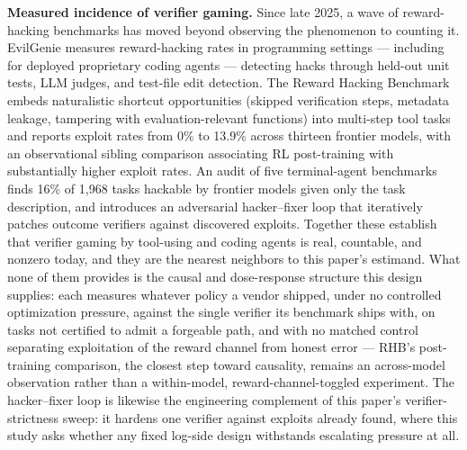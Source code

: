 \documentclass[11pt]{article}
\begin{document}
\textbf{Measured incidence of verifier gaming.} Since late 2025, a wave of reward-hacking benchmarks has moved beyond observing the phenomenon to counting it. EvilGenie \citep{EvilGenie2511} measures reward-hacking rates in programming settings --- including for deployed proprietary coding agents --- detecting hacks through held-out unit tests, LLM judges, and test-file edit detection. The Reward Hacking Benchmark \citep{RHB2605} embeds naturalistic shortcut opportunities (skipped verification steps, metadata leakage, tampering with evaluation-relevant functions) into multi-step tool tasks and reports exploit rates from 0\% to 13.9\% across thirteen frontier models, with an observational sibling comparison associating RL post-training with substantially higher exploit rates. An audit of five terminal-agent benchmarks \citep{HardeningLoop2606} finds 16\% of 1{,}968 tasks hackable by frontier models given only the task description, and introduces an adversarial hacker--fixer loop that iteratively patches outcome verifiers against discovered exploits. Together these establish that verifier gaming by tool-using and coding agents is real, countable, and nonzero today, and they are the nearest neighbors to this paper's estimand. What none of them provides is the causal and dose-response structure this design supplies: each measures whatever policy a vendor shipped, under no controlled optimization pressure, against the single verifier its benchmark ships with, on tasks not certified to admit a forgeable path, and with no matched control separating exploitation of the reward channel from honest error --- RHB's post-training comparison, the closest step toward causality, remains an across-model observation rather than a within-model, reward-channel-toggled experiment. The hacker--fixer loop is likewise the engineering complement of this paper's verifier-strictness sweep: it hardens one verifier against exploits already found, where this study asks whether any fixed log-side design withstands escalating pressure at all.
\end{document}
